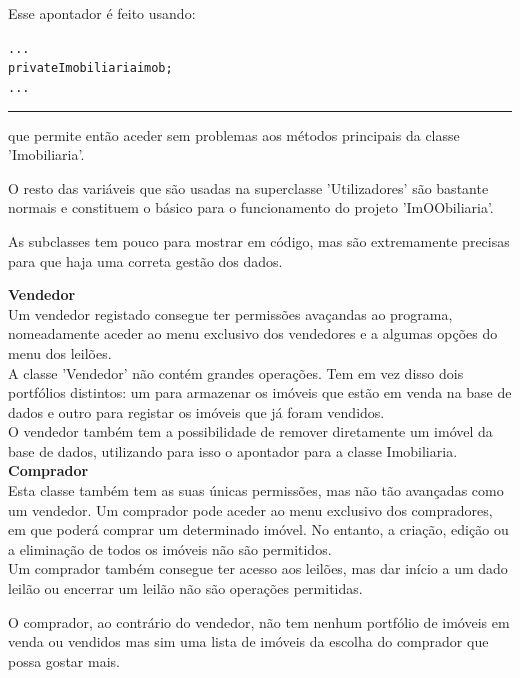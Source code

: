 \documentclass[12pt]{article}
\newenvironment{code}                    
{\textbf{
} \hspace{1cm} \hrulefill \\ 
\smallskip 
\begin{center}
\begin{minipage}{0.9\textwidth} 
\begin{alltt}\small}
{\end{alltt}
\end{minipage}
\end{center}
\hrule\smallskip
}
\begin{document}
Esse apontador é feito usando:
\newline
\begin{code}
...
    private Imobiliaria imob;
...
\end{code}
que permite então aceder sem problemas aos métodos principais da classe 'Imobiliaria'.
\newline

O resto das variáveis que são usadas na superclasse 'Utilizadores' são bastante normais e constituem o básico para o funcionamento do projeto 'ImOObiliaria'.
\newline

As subclasses tem pouco para mostrar em código, mas são extremamente precisas para que haja uma correta gestão dos dados.
\pagebreak

\textbf{Vendedor}
~\\

Um vendedor registado consegue ter permissões avaçandas ao programa, nomeadamente aceder ao menu exclusivo dos vendedores e a algumas opções do menu dos leilões. \\

A classe 'Vendedor' não contém grandes operações. Tem em vez disso dois portfólios distintos: um para armazenar os imóveis que estão em venda na base de dados e outro para registar os imóveis que já foram vendidos.
~\\

O vendedor também tem a possibilidade de remover diretamente um imóvel da base de dados, utilizando para isso o apontador para a classe Imobiliaria.
~\\

\textbf{Comprador}
~\\

Esta classe também tem as suas únicas permissões, mas não tão avançadas como um vendedor. Um comprador pode aceder ao menu exclusivo dos compradores, em que poderá comprar um determinado imóvel. No entanto, a criação, edição ou a eliminação de todos os imóveis não são permitidos.
\\

Um comprador também consegue ter acesso aos leilões, mas dar início a um dado leilão ou encerrar um leilão não são operações permitidas.

O comprador, ao contrário do vendedor, não tem nenhum portfólio de imóveis em venda ou vendidos mas sim uma lista de imóveis da escolha do comprador que possa gostar mais.
\\
\end{document}

